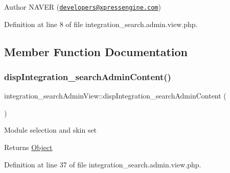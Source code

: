 \begin{DoxyAuthor}{Author}
N\+A\+V\+ER (\href{mailto:developers@xpressengine.com}{\tt developers@xpressengine.\+com}) 
\end{DoxyAuthor}


Definition at line 8 of file integration\+\_\+search.\+admin.\+view.\+php.



\subsection{Member Function Documentation}
\hypertarget{classintegration__searchAdminView_a2ae221c755a586cd2af8d1758edc01c6}{}\label{classintegration__searchAdminView_a2ae221c755a586cd2af8d1758edc01c6} 
\subsubsection{\texorpdfstring{disp\+Integration\+\_\+search\+Admin\+Content()}{dispIntegration\_searchAdminContent()}}
{\footnotesize\ttfamily integration\+\_\+search\+Admin\+View\+::disp\+Integration\+\_\+search\+Admin\+Content (\begin{DoxyParamCaption}{ }\end{DoxyParamCaption})}

Module selection and skin set

\begin{DoxyReturn}{Returns}
\hyperlink{classObject}{Object} 
\end{DoxyReturn}


Definition at line 37 of file integration\+\_\+search.\+admin.\+view.\+php.

\hypertarget{classintegration__searchAdminView_a3699d7f7d9f12795783a1cc4d42fcba2}{}\label{classintegration__searchAdminView_a3699d7f7d9f12795783a1cc4d42fcba2} 
